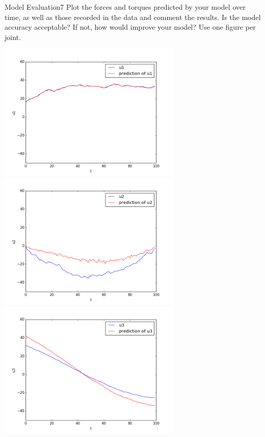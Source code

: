 \begin{questions}


\begin{question}{Model Evaluation}{7}
Plot the forces and torques predicted by your model over time, as well as those recorded in the data and comment the results. Is the model accuracy acceptable? If not, how would improve your model? Use one figure per joint.

\begin{answer}
	\includegraphics[width=87mm]{ML/first_joint.png}
	\includegraphics[width=87mm]{ML/second_joint.png}
	\includegraphics[width=87mm]{ML/third_joint.png}\\
	

\end{answer}
\end{question}
\end{questions}
